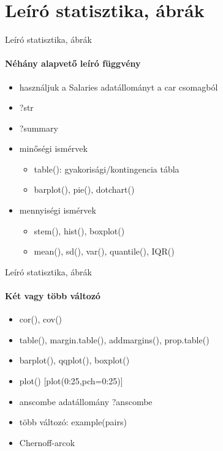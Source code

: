 \documentclass[10pt]{beamer}
\begin{document}
\section{Leíró statisztika, ábrák}

\begin{frame}{Leíró statisztika, ábrák}
\framesubtitle{Néhány alapvető leíró függvény}
\begin{itemize}
\item használjuk a Salaries adatállományt a car csomagból
\item ?str
\item ?summary
\item minőségi ismérvek
\begin{itemize}
\item table(): gyakorisági/kontingencia tábla
\item barplot(), pie(), dotchart()
\end{itemize}
\item mennyiségi ismérvek
\begin{itemize}
\item stem(), hist(), boxplot()
\item mean(), sd(), var(), quantile(), IQR()
\end{itemize}
\end{itemize}
\end{frame}

\begin{frame}{Leíró statisztika, ábrák}
\framesubtitle{Két vagy több változó}
\begin{itemize}
\item cor(), cov()
\item table(), margin.table(), addmargins(), prop.table()
\item barplot(), qqplot(), boxplot()
\item plot() [plot(0:25,pch=0:25)]
\item anscombe adatállomány ?anscombe
\item több változó: example(pairs)
\item Chernoff-arcok
\end{itemize}
\end{frame}
\end{document}
